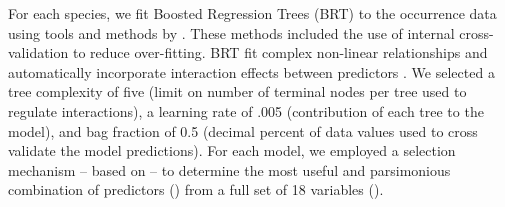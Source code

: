 For each species, we fit Boosted Regression Trees (BRT) \citep{frie02} to the occurrence data using tools and methods by \cite{elit08}. These methods included the use of internal cross-validation to reduce over-fitting. BRT fit complex non-linear relationships and automatically incorporate interaction effects between predictors \citep{elit09}. We selected a tree complexity of five (limit on number of terminal nodes per tree used to regulate interactions), a learning rate of .005 (contribution of each tree to the model), and bag fraction of 0.5 (decimal percent of data values used to cross validate the model predictions). For each model, we employed a selection mechanism -- based on \cite{elit08} -- to determine the most useful and parsimonious combination of predictors () from a full set of 18 variables ().

